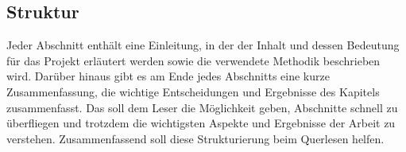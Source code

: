 \subsection{Struktur}\label{kapitel_struktur}
%
%
%
%
Jeder Abschnitt enthält eine Einleitung, in der der Inhalt und dessen Bedeutung für das Projekt erläutert werden sowie die verwendete Methodik beschrieben wird.\newline%
Darüber hinaus gibt es am Ende jedes Abschnitts eine kurze Zusammenfassung, die wichtige Entscheidungen und Ergebnisse des Kapitels zusammenfasst. Das soll dem Leser die Möglichkeit geben, Abschnitte schnell zu überfliegen und trotzdem die wichtigsten Aspekte und Ergebnisse der Arbeit zu verstehen. Zusammenfassend soll diese Strukturierung beim Querlesen helfen.